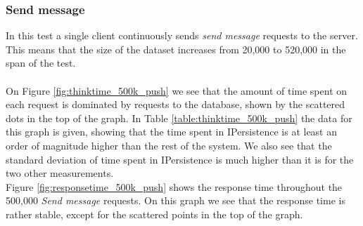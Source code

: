 \documentclass{article}
\begin{document}
            \subsubsection{Send message}
                In this test a single client continuously sends \textit{send message} requests to the server. This means that the size of the dataset increases from 20,000 to 520,000 in the span of the test.\\
                \\
                On Figure \ref{fig:thinktime_500k_push} we see that the amount of time spent on each request is dominated by requests to the database, shown by the scattered dots in the top of the graph. In Table \ref{table:thinktime_500k_push} the data for this graph is given, showing that the time spent in IPersistence is at least an order of magnitude higher than the rest of the system. We also see that the standard deviation of time spent in IPersistence is much higher than it is for the two other measurements.\\
                Figure \ref{fig:responsetime_500k_push} shows the response time throughout the 500,000 \textit{Send message} requests. On this graph we see that the response time is rather stable, except for the scattered points in the top of the graph.
\end{document}
